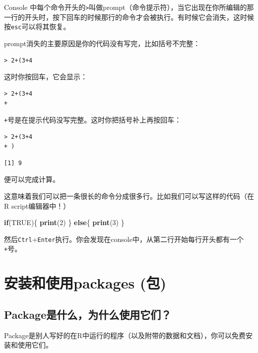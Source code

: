 \documentclass[]{book}
\newenvironment{Shaded}{\begin{snugshade}}{\end{snugshade}}
\newcommand{\ControlFlowTok}[1]{\textcolor[rgb]{0.13,0.29,0.53}{\textbf{#1}}}
\newcommand{\DecValTok}[1]{\textcolor[rgb]{0.00,0.00,0.81}{#1}}
\newcommand{\KeywordTok}[1]{\textcolor[rgb]{0.13,0.29,0.53}{\textbf{#1}}}
\newcommand{\NormalTok}[1]{#1}
\newcommand{\OtherTok}[1]{\textcolor[rgb]{0.56,0.35,0.01}{#1}}
\begin{document}
Console 中每个命令开头的\texttt{\textgreater{}}叫做prompt（命令提示符），当它出现在你所编辑的那一行的开头时，按下回车的时候那行的命令才会被执行。有时候它会消失，这时候按\texttt{esc}可以将其恢复。

prompt消失的主要原因是你的代码没有写完，比如括号不完整：

\begin{verbatim}
> 2+(3+4
\end{verbatim}

这时你按回车，它会显示：

\begin{verbatim}
> 2+(3+4
+
\end{verbatim}

\texttt{+}号是在提示代码没写完整。这时你把括号补上再按回车：

\begin{verbatim}
> 2+(3+4
+ )
\end{verbatim}

\begin{verbatim}
[1] 9
\end{verbatim}

便可以完成计算。

这意味着我们可以把一条很长的命令分成很多行。比如我们可以写这样的代码（在R script编辑器中！）

\begin{Shaded}
\begin{Highlighting}[]
\ControlFlowTok{if}\NormalTok{(}\OtherTok{TRUE}\NormalTok{)\{}
  \KeywordTok{print}\NormalTok{(}\DecValTok{2}\NormalTok{)}
\NormalTok{\} }\ControlFlowTok{else}\NormalTok{\{}
  \KeywordTok{print}\NormalTok{(}\DecValTok{3}\NormalTok{)}
\NormalTok{\}}
\end{Highlighting}
\end{Shaded}

然后\texttt{Ctrl}+\texttt{Enter}执行。你会发现在console中，从第二行开始每行开头都有一个\texttt{+}号。

\hypertarget{packages}{%
\chapter{安装和使用packages (包)}\label{packages}}

\hypertarget{package}{%
\section{Package是什么，为什么使用它们？}\label{package}}

Package是别人写好的在R中运行的程序（以及附带的数据和文档），你可以免费安装和使用它们。
\end{document}
